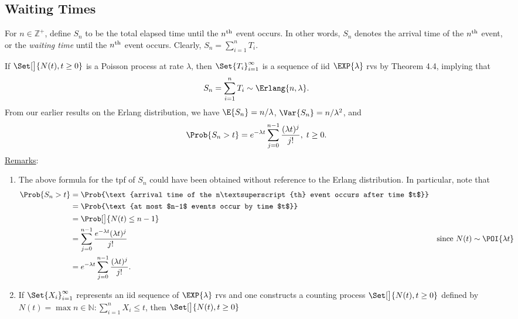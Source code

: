 \subsection*{Waiting Times}
\begin{Regular}
    For $ n\in\mathbb{Z}^+ $, define $ S_n $ to be the total elapsed time until the $ n\textsuperscript{th} $ event occurs. In other words,
    $ S_n $ denotes the arrival time of the $ n\textsuperscript{th} $ event, or the \emph{waiting time} until the $ n\textsuperscript{th} $
    event occurs. Clearly, $ S_n=\sum_{i=1}^{n}T_i $.

    If $ \Set[\big]{N(t),t\ge 0} $ is a Poisson process at rate $ \lambda $, then $ \Set{T_i}_{i=1}^\infty $ is a sequence of iid $ \EXP{\lambda} $
    rvs by Theorem 4.4, implying that
    \[ S_n=\sum_{i=1}^{n}T_i \sim \Erlang{n,\lambda}. \]
    From our earlier results on the Erlang distribution, we have $ \E{S_n}=n/\lambda $, $ \Var{S_n}=n/\lambda^2 $, and
    \[ \Prob{S_n>t}=e^{-\lambda t}\sum_{j=0}^{n-1}\frac{(\lambda t)^j}{j!},\; t\ge 0. \]
    \tcblower{}
    \underline{Remarks}:
    \begin{enumerate}[(1)]
        \item The above formula for the tpf of $ S_n $ could have been obtained without reference to the Erlang distribution. In particular, note that
              \begin{align*}
                  \Prob{S_n>t}
                   & =\Prob{\text{arrival time of the n\textsuperscript{th} event occurs after time $t$}}                                                \\
                   & =\Prob{\text{at most $n-1$ events occur by time $t$}}                                                                               \\
                   & =\Prob[\big]{N(t)\le n-1}                                                                                                           \\
                   & =\sum_{j=0}^{n-1}\frac{e^{-\lambda t}(\lambda t)^j}{j!}                              &  & \text{since $ N(t)\sim \POI{\lambda t} $} \\
                   & =e^{-\lambda t}\sum_{j=0}^{n-1}\frac{(\lambda t)^j}{j!}.
              \end{align*}
        \item If $ \Set{X_i}_{i=1}^\infty $ represents an iid sequence of $ \EXP{\lambda} $ rvs and one constructs a counting process
              $ \Set[\big]{N(t),t\ge 0} $ defined by $ N(t)=\max{n\in\mathbb{N}:\sum_{i=1}^{n}X_i\le t} $, then $ \Set[\big]{N(t),t\ge 0} $

\end{enumerate}
\end{Regular}
